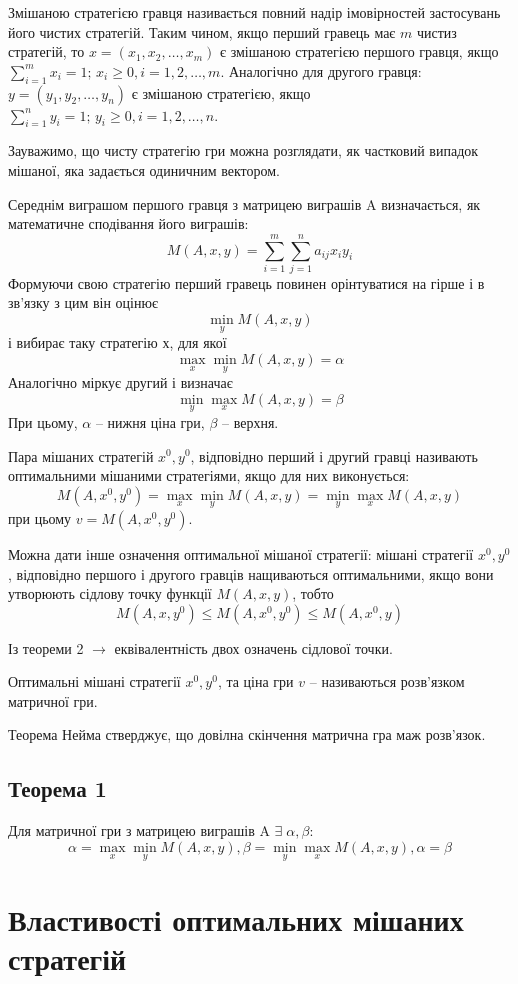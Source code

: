 \documentclass[12pt,a4paper]{book}
\begin{document}
Змішаною стратегією гравця називається повний надір імовірностей застосувань його чистих стратегій. Таким чином, якщо перший гравець має $m$ чистиз стратегій, то $x=(x_1, x_2, \dots, x_m)$ є змішаною стратегією першого гравця, якщо $\sum_{i=1}^m x_i = 1; \, x_i \ge 0, i=1, 2, \dots, m$. Аналогічно для другого гравця: $y=(y_1, y_2, \dots, y_n)$ є змішаною стратегією, якщо$\sum_{i=1}^n y_i = 1; \, y_i \ge 0, i=1, 2, \dots, n$.

Зауважимо, що чисту стратегію гри можна розглядати, як частковий випадок мішаної, яка задається одиничним вектором.

Середнім виграшом першого гравця з матрицею виграшів A визначається, як математичне сподівання його виграшів:
\[
M(A, x, y)=\sum_{i=1}^m\sum_{j=1}^n a_{ij}x_i y_i
\]
Формуючи свою стратегію перший гравець повинен орінтуватися на гірше $і$ в зв'язку з цим він оцінює
\[\min_y M(A, x, y)\]
і вибирає таку стратегію $х$, для якої
\[\max_x\min_y M(A, x, y)=\alpha\]
Аналогічно міркує другий і визначає
\[\min_y\max_x M(A, x, y)=\beta\]
При цьому, $\alpha$ -- нижня ціна гри, $\beta$ -- верхня.

Пара мішаних стратегій $x^0, y^0$, відповідно перший і другий гравці називають оптимальними мішаними стратегіями, якщо для них виконується:
\[M(A, x^0, y^0)=\max_x\min_y M(A, x, y)=\min_y\max_x M(A, x, y)\]
при цьому $v = M(A, x^0, y^0)$.

Можна дати інше означення оптимальної мішаної стратегії: мішані стратегії $x^0, y^0$, відповідно першого і другого гравців нащиваються оптимальними, якщо вони утворюють сідлову точку функції $M(A, x, y)$, тобто
\[ M(A, x, y^0) \le M(A, x^0, y^0) \le M(A, x^0, y)\]

Із теореми 2 $\to$ еквівалентність двох означень сідлової точки.

Оптимальні мішані стратегії $x^0, y^0$, та ціна гри $v$ -- називаються розв'язком матричної гри.

Теорема Нейма стверджує, що довілна скінчення матрична гра маж розв'язок.
\subsection{Теорема 1}
Для матричної гри з матрицею виграшів A $\exists \; \alpha, \beta$:
\[\alpha = \max_x\min_y M(A, x, y), \beta=\min_y\max_x M(A, x, y), \alpha = \beta\]
\section{Властивості оптимальних мішаних стратегій}
\end{document}
